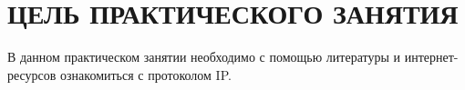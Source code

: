 \section{ЦЕЛЬ ПРАКТИЧЕСКОГО ЗАНЯТИЯ}

В данном практическом занятии необходимо с помощью литературы и интернет-ресурсов
ознакомиться с протоколом IP.

\newpage
